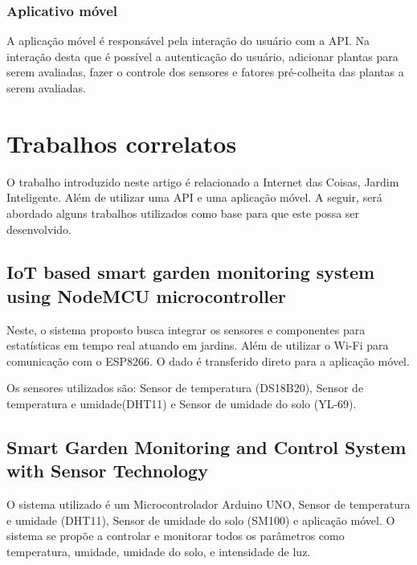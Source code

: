 \documentclass[conference]{IEEEtran}
\begin{document}
\subsubsection{Aplicativo móvel}
A aplicação móvel é responsável pela interação do usuário com a API. Na interação desta que é possível a autenticação do usuário, adicionar plantas para serem avaliadas, fazer o controle dos sensores e fatores pré-colheita das plantas a serem avaliadas.


\section{Trabalhos correlatos}
O trabalho introduzido neste artigo é relacionado a Internet das Coisas, Jardim Inteligente. Além de utilizar uma API e uma aplicação móvel. A seguir, será abordado alguns trabalhos utilizados como base para que este possa ser desenvolvido.

\subsection{IoT based smart garden monitoring system using NodeMCU
microcontroller}
Neste, o sistema proposto busca integrar os sensores e componentes para estatísticas em tempo real atuando em jardins. Além de utilizar o Wi-Fi para comunicação com o ESP8266. O dado é transferido direto para a aplicação móvel.  

Os sensores utilizados são: Sensor de temperatura (DS18B20), Sensor de temperatura e umidade(DHT11) e Sensor de umidade do solo (YL-69). \cite{b11}

\subsection{Smart Garden Monitoring and Control System with
Sensor Technology}
O sistema utilizado é um Microcontrolador Arduino UNO, Sensor de temperatura e umidade (DHT11), Sensor de umidade do solo (SM100) e aplicação móvel. O sistema se propõe a controlar e monitorar todos os parâmetros como temperatura, umidade, umidade do solo, e intensidade de luz. \cite{b10}
\end{document}
